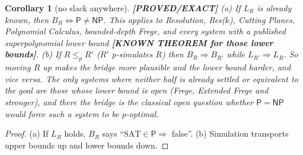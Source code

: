 \documentclass[11pt]{article}
\newtheorem{corollary}[theorem]{Corollary}
\theoremstyle{remark}
\newcommand{\SAT}{\mathrm{SAT}}
\newcommand{\status}[1]{\textbf{[#1]}}
\begin{document}
\begin{corollary}[no slack anywhere]\status{PROVED/EXACT}
(a) If $L_R$ is already known, then $B_R\iff\mathsf P\neq\mathsf{NP}$.
This applies to Resolution, Res($k$), Cutting Planes, Polynomial Calculus,
bounded-depth Frege, and every system with a published superpolynomial
lower bound \status{KNOWN THEOREM for those lower bounds}.
(b) If $R\le_p R'$ ($R'$ p-simulates $R$) then $B_R\Rightarrow B_{R'}$ while
$L_{R'}\Rightarrow L_R$. So moving $R$ up makes the bridge more plausible
and the lower bound harder, and vice versa. The only systems where neither
half is already settled or equivalent to the goal are those whose lower
bound is open (Frege, Extended Frege and stronger), and there the bridge is
the classical open question whether $\mathsf P=\mathsf{NP}$ would force such a
system to be p-optimal.
\end{corollary}
\begin{proof}
(a) If $L_R$ holds, $B_R$ says ``$\SAT\in\mathsf P\Rightarrow$ false''. (b)
Simulation transports upper bounds up and lower bounds down.
\end{proof}
\end{document}
